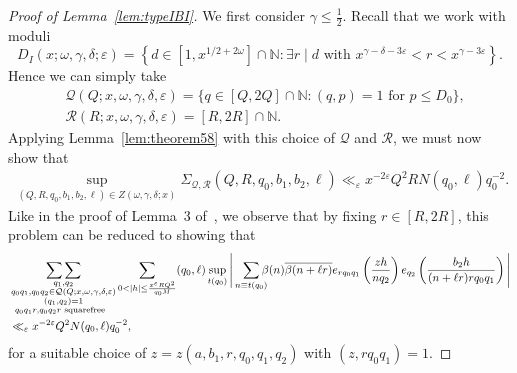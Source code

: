 \documentclass{amsart}
\numberwithin{equation}{section}
\begin{document}
\begin{proof}[Proof of Lemma~\ref{lem:typeIBI}] We first consider $\gamma \leq \frac{1}{2}$. 
Recall that we work with moduli $$D_I(x;\omega,\gamma,\delta;\varepsilon) = \left\{d \in  [1, x^{1/2+2\omega}]\cap \mathbb{N}:  \exists r \mid d \mbox{ with } x^{\gamma-\delta -3\varepsilon} < r < x^{\gamma - 3\varepsilon} \right\}.$$ 
Hence we can simply take
\begin{align*}
&\mathcal{Q}(Q;x,\omega,\gamma,\delta,\varepsilon)=\{q\in [Q,2Q] \cap \mathbb{N}: (q,p)=1 \mbox{ for } p \leq D_0\},\\
&\mathcal{R}(R;x,\omega,\gamma,\delta,\varepsilon)=[R,2R] \cap \mathbb{N}.
\end{align*}
Applying Lemma~\ref{lem:theorem58} with this choice of $\mathcal{Q}$ and $\mathcal{R}$, we must now show that 
\begin{align*}
\sup_{(Q,R,q_0,b_1,b_2,\ell) \in Z(\omega,\gamma,\delta;x)}\Sigma_{\mathcal{Q},\mathcal{R}}(Q,R,q_0,b_1,b_2,\ell) \ll_\varepsilon x^{-2\varepsilon} Q^2RN (q_0, \ell) q_0^{-2}.
\end{align*}
Like in the proof of Lemma~3 of~\cite{Baker:2017:BIP}, we observe that by fixing $r \in [R,2R]$, this problem can be reduced to showing that
\begin{align*}
&  \mathop{\sum\sum}\limits_{\substack{q_1, q_2 \\ q_0 q_1,q_0 q_2 \in \mathcal{Q}(Q;x,\omega,\gamma,\delta,\varepsilon) \\ (q_1,q_2)=1 \\  q_0q_1r, q_0q_2r \mbox{\begin{scriptsize}
squarefree
\end{scriptsize} }
}} \sum_{0<|h| \leq \frac{x^\varepsilon RQ^2}{q_0 M}}  (q_0,\ell) \sup_{ t(q_0)}   \Bigg| \sum_{\substack{n  \equiv t (q_0) }} \!\!\!\! \beta(n)\overline{\beta(n+\ell r)}   e_{rq_0q_1}\left(\dfrac{z h}{nq_2}\right) e_{q_2}\left(\dfrac{b_2h}{(n+\ell r)rq_0q_1}\right) \Bigg|  \\ &\ll_\varepsilon x^{-2\varepsilon} Q^2N (q_0, \ell) q_0^{-2},
\end{align*} 
for a suitable choice of $z=z(a,b_1,r,q_0,q_1,q_2)$ with $(z,rq_0q_1)=1$. 
\medskip 


\end{proof}
\end{document}
